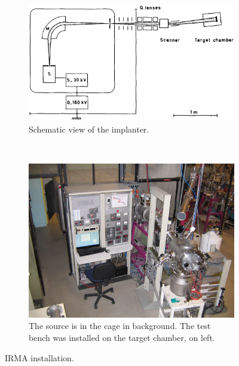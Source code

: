 \begin{figure}[!ht]
	\begin{subfigure}[t]{0.5\textwidth}
		\includegraphics[width=\textwidth]{04_IPHI_Test/figures/fig000_IRMA01}
		\caption{Schematic view of the implanter.}
		\label{}
	\end{subfigure}
	~
	\begin{subfigure}[t]{0.5\textwidth}
		\includegraphics[width=\textwidth]{04_IPHI_Test/figures/fig000_IRMA02}
		\caption{The source is in the cage in background. The test bench was installed on the target chamber, on left.}
		\label{}
	\end{subfigure}
	\caption[IRMA installation]{IRMA installation.}
	\label{chap4:IRMA}
\end{figure}
